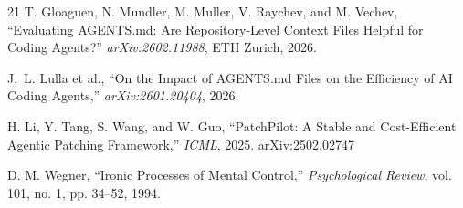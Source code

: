 \documentclass[conference,10pt]{IEEEtran}
\begin{document}
\begin{thebibliography}{21}
 T. Gloaguen, N. Mundler, M. Muller, V. Raychev, and M. Vechev, ``Evaluating AGENTS.md: Are Repository-Level Context Files Helpful for Coding Agents?'' \textit{arXiv:2602.11988}, ETH Zurich, 2026.

 J.~L. Lulla et al., ``On the Impact of AGENTS.md Files on the Efficiency of AI Coding Agents,'' \textit{arXiv:2601.20404}, 2026.

 H. Li, Y. Tang, S. Wang, and W. Guo, ``PatchPilot: A Stable and Cost-Efficient Agentic Patching Framework,'' \textit{ICML}, 2025. arXiv:2502.02747

 D. M. Wegner, ``Ironic Processes of Mental Control,'' \textit{Psychological Review}, vol. 101, no. 1, pp. 34--52, 1994.

\end{thebibliography}

\balance
\end{document}
